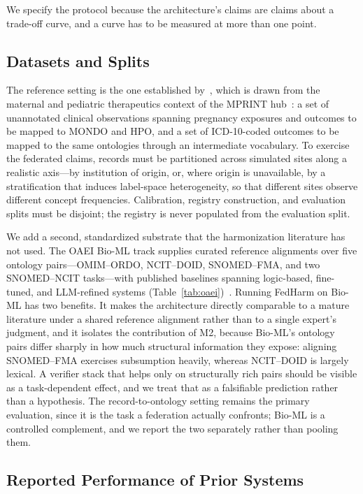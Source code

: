 \documentclass[conference]{IEEEtran}
\begin{document}
We specify the protocol because the architecture's claims are claims about a trade-off curve, and a curve has to be measured at more than one point.

\subsection{Datasets and Splits}

The reference setting is the one established by~\cite{b1}, which is drawn from the maternal and pediatric therapeutics context of the MPRINT hub~\cite{b37}: a set of unannotated clinical observations spanning pregnancy exposures and outcomes to be mapped to MONDO and HPO, and a set of ICD-10-coded outcomes to be mapped to the same ontologies through an intermediate vocabulary. To exercise the federated claims, records must be partitioned across simulated sites along a realistic axis---by institution of origin, or, where origin is unavailable, by a stratification that induces label-space heterogeneity, so that different sites observe different concept frequencies. Calibration, registry construction, and evaluation splits must be disjoint; the registry is never populated from the evaluation split.

We add a second, standardized substrate that the harmonization literature has not used. The OAEI Bio-ML track supplies curated reference alignments over five ontology pairs---OMIM--ORDO, NCIT--DOID, SNOMED--FMA, and two SNOMED--NCIT tasks---with published baselines spanning logic-based, fine-tuned, and LLM-refined systems (Table~\ref{tab:oaei})~\cite{b55,b54}. Running FedHarm on Bio-ML has two benefits. It makes the architecture directly comparable to a mature literature under a shared reference alignment rather than to a single expert's judgment, and it isolates the contribution of M2, because Bio-ML's ontology pairs differ sharply in how much structural information they expose: aligning SNOMED--FMA exercises subsumption heavily, whereas NCIT--DOID is largely lexical. A verifier stack that helps only on structurally rich pairs should be visible as a task-dependent effect, and we treat that as a falsifiable prediction rather than a hypothesis. The record-to-ontology setting remains the primary evaluation, since it is the task a federation actually confronts; Bio-ML is a controlled complement, and we report the two separately rather than pooling them.

\subsection{Reported Performance of Prior Systems}
\label{sec:prior}
\end{document}

